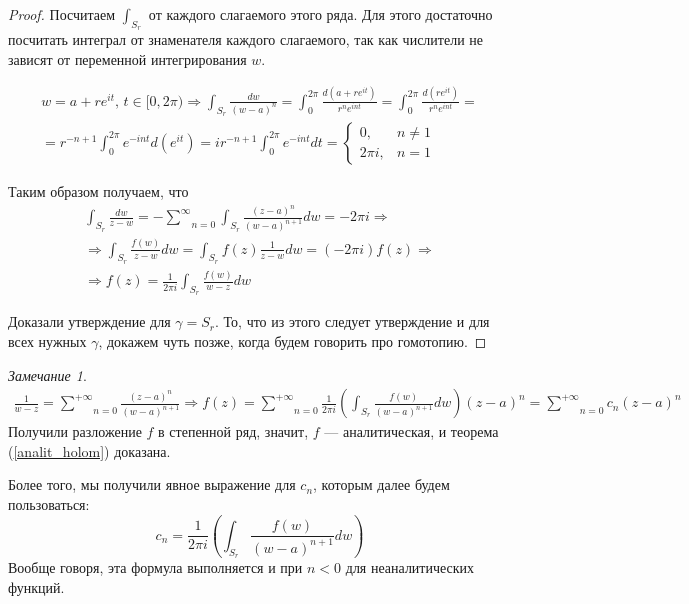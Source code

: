 \documentclass[12pt]{article}
\newcommand{\Ra}{\Rightarrow}
\theoremstyle{thmnote}
\theoremstyle{remark}
\newtheorem*{remark}{Замечание}
\theoremstyle{defnote}
\begin{document}
\begin{proof}
    Посчитаем $\int_{S_r}$ от каждого слагаемого этого ряда. Для этого достаточно посчитать интеграл от знаменателя каждого слагаемого, так как числители не зависят от переменной интегрирования $w$.

    \begin{gather*}
        w = a + r e^{it},\, t \in [0, 2\pi) \Ra \int_{S_r} \frac{dw}{(w - a)^n} = \int_{0}^{2\pi} \frac{d\left(a + re^{it}\right)}{r^ne^{int}} = \int_{0}^{2\pi} \frac{d\left(re^{it}\right)}{r^ne^{int}} =\\= r^{-n+1} \int_{0}^{2\pi} e^{-int} d\left(e^{it}\right) = i r^{-n+1} \int_{0}^{2\pi} e^{-int} dt = \begin{cases}
            0, & n \neq 1 \\ 2\pi i, & n = 1
        \end{cases}
    \end{gather*}
    
    Таким образом получаем, что
    \begin{gather*}
        \int_{S_r} \frac{dw}{z - w} = - \underset{n = 0}{\overset{\infty}{\sum}} \int_{S_r} \frac{(z - a)^n}{(w - a)^{n+1}} dw = - 2\pi i \Ra \\
        \Ra \int_{S_r} \frac{f(w)}{z - w}dw = \int_{S_r} f(z) \frac{1}{z - w}dw = (- 2\pi i) f(z) \Ra\\\Ra f(z) = \frac{1}{2\pi i} \int_{S_r} \frac{f(w)}{w - z}dw
    \end{gather*}

    Доказали утверждение для $\gamma = S_r$. То, что из этого следует утверждение и для всех нужных $\gamma$, докажем чуть позже, когда будем говорить про гомотопию.
\end{proof}

\begin{remark}
    \begin{align*}
        \frac{1}{w - z} = \underset{n = 0}{\overset{+\infty}{\sum}} \frac{(z - a)^n}{(w - a)^{n+1}} \Ra f(z) = \underset{n = 0}{\overset{+\infty}{\sum}} \frac{1}{2 \pi i} \left(\int_{S_r} \frac{f(w)}{(w - a)^{n+1}} dw\right) (z - a)^n = \underset{n = 0}{\overset{+\infty}{\sum}} c_n (z - a)^n
    \end{align*}
    Получили разложение $f$ в степенной ряд, значит, $f$ --- аналитическая, и теорема (\ref{analit_holom}) доказана.

    Более того, мы получили явное выражение для $c_n$, которым далее будем пользоваться:
    \begin{equation*}
        c_n = \frac{1}{2 \pi i} \left(\int_{S_r} \frac{f(w)}{(w - a)^{n+1}} dw\right)
    \end{equation*}
    Вообще говоря, эта формула выполняется и при $n < 0$ для неаналитических функций.
\end{remark}
\end{document}
